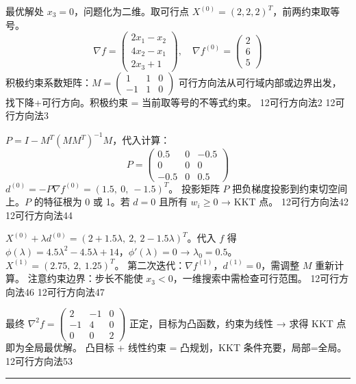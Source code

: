   {最优解处 $x_3=0$，问题化为二维。取可行点 $X^{(0)} = (2,2,2)^T$，前两约束取等号。
  \[
  \nabla f = \begin{pmatrix} 2x_1-x_2 \\ 4x_2-x_1 \\ 2x_3+1 \end{pmatrix},\quad
  \nabla f^{(0)} = \begin{pmatrix} 2 \\ 6 \\ 5 \end{pmatrix}
  \]
  积极约束系数矩阵：$M = \begin{pmatrix}1&1&0\\-1&1&0\end{pmatrix}$}
  {可行方向法从可行域内部或边界出发，找下降+可行方向。积极约束 = 当前取等号的不等式约束。}
  {12可行方向法}{2}
  {12可行方向法}{3}

  {$P = I - M^T(MM^T)^{-1}M$，代入计算：
  \[
  P = \begin{pmatrix}0.5&0&-0.5\\0&0&0\\-0.5&0&0.5\end{pmatrix}
  \]
  $d^{(0)} = -P\nabla f^{(0)} = (1.5,\ 0,\ -1.5)^T$。}
  {投影矩阵 $P$ 把负梯度投影到约束切空间上。$P$ 的特征根为 0 或 1。若 $d=0$ 且所有 $w_i\ge 0$ → KKT 点。}
  {12可行方向法}{42}
  {12可行方向法}{44}

  {$X^{(0)} + \lambda d^{(0)} = (2+1.5\lambda,\ 2,\ 2-1.5\lambda)^T$。代入 $f$ 得 $\phi(\lambda)=4.5\lambda^2-4.5\lambda+14$，$\phi'(\lambda)=0$ → $\lambda_0=0.5$。\\
  $X^{(1)} = (2.75,\ 2,\ 1.25)^T$。
  第二次迭代：$\nabla f^{(1)}$，$d^{(1)}=0$，需调整 $M$ 重新计算。}
  {注意约束边界：步长不能使 $x_3<0$，一维搜索中需检查可行范围。}
  {12可行方向法}{46}
  {12可行方向法}{47}

  {最终 $\nabla^2 f = \begin{pmatrix}2&-1&0\\-1&4&0\\0&0&2\end{pmatrix}$ 正定，目标为凸函数，约束为线性 → 求得 KKT 点即为全局最优解。}
  {凸目标 + 线性约束 = 凸规划，KKT 条件充要，局部=全局。}
  {12可行方向法}{53}

\rule{\textwidth}{0.4pt}

